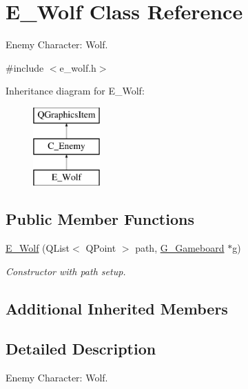 \hypertarget{class_e___wolf}{}\section{E\+\_\+\+Wolf Class Reference}
\label{class_e___wolf}


Enemy Character\+: Wolf.  




{\ttfamily \#include $<$e\+\_\+wolf.\+h$>$}

Inheritance diagram for E\+\_\+\+Wolf\+:\begin{figure}[H]
\begin{center}
\leavevmode
\includegraphics[height=3.000000cm]{class_e___wolf}
\end{center}
\end{figure}
\subsection*{Public Member Functions}
\begin{DoxyCompactItemize}
\item 
\hyperlink{class_e___wolf_a18f020e518d05c186d4feefc2aea24b5}{E\+\_\+\+Wolf} (Q\+List$<$ Q\+Point $>$ path, \hyperlink{class_g___gameboard}{G\+\_\+\+Gameboard} $\ast$g)
\begin{DoxyCompactList}\small\item\em Constructor with path setup. \end{DoxyCompactList}\end{DoxyCompactItemize}
\subsection*{Additional Inherited Members}


\subsection{Detailed Description}
Enemy Character\+: Wolf. 

